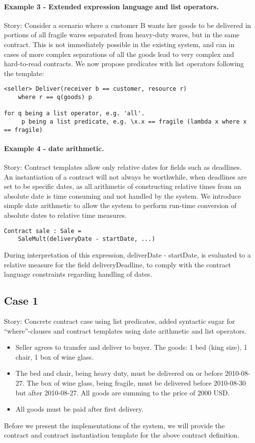 \documentclass[10pt,a4paper,final,oneside,openany,article]{memoir}
\begin{document}
\paragraph{Example 3 - Extended expression language and list operators.}
Story: Consider a scenario where a customer B wants her goods to be delivered in
portions of all fragile wares separated from heavy-duty wares, but in the same
contract. This is not immediately possible in the existing system, and can in
cases of more complex separations of all the goods lead to very complex and
hard-to-read contracts. We now propose predicates with list operators following
the template:

\begin{lstlisting}
<seller> Deliver(receiver b == customer, resource r)
    where r == q(goods) p

for q being a list operator, e.g. 'all'.
     p being a list predicate, e.g. \x.x == fragile (lambda x where x == fragile)
\end{lstlisting}

\paragraph{Example 4 - date arithmetic.}
Story: Contract templates allow only relative dates for fields such as
deadlines. An instantiation of a contract will not always be worthwhile, when
deadlines are set to be specific dates, as all arithmetic of constructing
relative times from an absolute date is time consuming and not handled by the
system. We introduce simple date arithmetic to allow the system to perform
run-time conversion of absolute dates to relative time measures.

\begin{lstlisting}
Contract sale : Sale =
    SaleMult(deliveryDate - startDate, ...)
\end{lstlisting}

During interpretation of this expression, deliverDate - startDate, is evaluated
to a relative measure for the field deliveryDeadline, to comply with the
contract language constraints regarding handling of dates.


\subsection{Case 1}
Story: Concrete contract case using list predicates, added syntactic sugar for
“where”-clauses and contract templates using date arithmetic and list operators.
\begin{itemize}
\item Seller agrees to transfer and deliver to buyer. The goods: 1 bed (king
size), 1 chair, 1 box of wine glass.
\item The bed and chair, being heavy duty, must be delivered on or before
2010-08-27. The box of wine glass, being fragile, must be delivered before
2010-08-30 but after 2010-08-27. All goods are summing to the price of 2000 USD.
\item All goods must be paid after first delivery.
\end{itemize}
Before we present the implementations of the system, we will provide the contract and contract instantiation template for the above contract definition.
\end{document}
